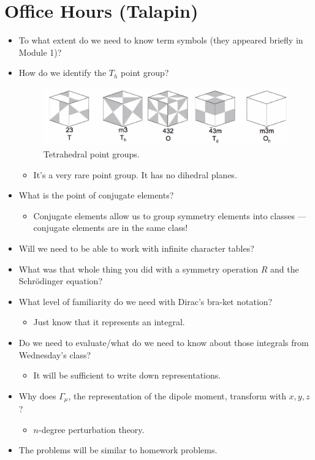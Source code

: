 \documentclass[../notes.tex]{subfiles}
\begin{document}
\section{Office Hours (Talapin)}
\begin{itemize}
    \item To what extent do we need to know term symbols (they appeared briefly in Module 1)?
    \item How do we identify the $T_h$ point group?
    \begin{figure}[h!]
        \centering
        \includegraphics[width=0.7\linewidth]{../ExtFiles/tetrahedralPGs.png}
        \caption{Tetrahedral point groups.}
        \label{fig:tetrahedralPGs}
    \end{figure}
    \begin{itemize}
        \item It's a very rare point group. It has no dihedral planes.
    \end{itemize}
    \item What is the point of conjugate elements?
    \begin{itemize}
        \item Conjugate elements allow us to group symmetry elements into classes --- conjugate elements are in the same class!
    \end{itemize}
    \item Will we need to be able to work with infinite character tables?
    \item What was that whole thing you did with a symmetry operation $R$ and the Schr\"{o}dinger equation?
    \item What level of familiarity do we need with Dirac's bra-ket notation?
    \begin{itemize}
        \item Just know that it represents an integral.
    \end{itemize}
    \item Do we need to evaluate/what do we need to know about those integrals from Wednesday's class?
    \begin{itemize}
        \item It will be sufficient to write down representations.
    \end{itemize}
    \item Why does $\Gamma_\mu$, the representation of the dipole moment, transform with $x,y,z$?
    \begin{itemize}
        \item $n$-degree perturbation theory.
    \end{itemize}
    \item The problems will be similar to homework problems.
\end{itemize}
\end{document}
